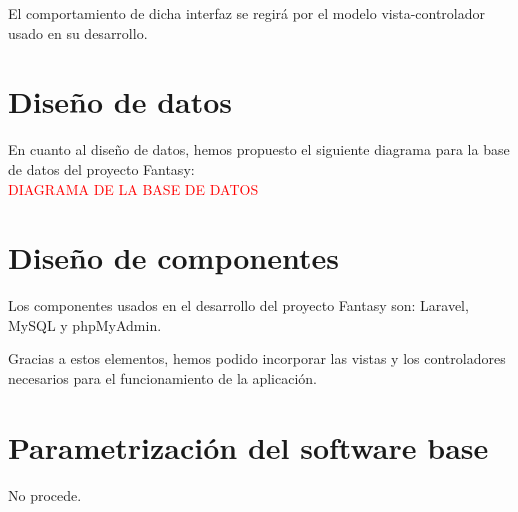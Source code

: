 El comportamiento de dicha interfaz se regirá por el modelo vista-controlador usado en su desarrollo.

\section{Diseño de datos}
En cuanto al diseño de datos, hemos propuesto el siguiente diagrama para la base de datos del proyecto Fantasy:\\
\textcolor{red}{DIAGRAMA DE LA BASE DE DATOS}

\section{Diseño de componentes}
Los componentes usados en el desarrollo del proyecto Fantasy son: Laravel, MySQL y phpMyAdmin.

Gracias a estos elementos, hemos podido incorporar las vistas y los controladores necesarios para el funcionamiento de la aplicación.

\section{Parametrización del software base}
No procede.